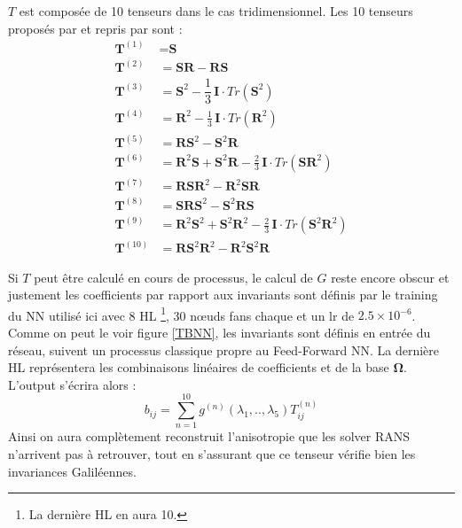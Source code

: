 \documentclass[a4paper,12pt]{report}
\numberwithin{equation}{section} %
\begin{document}
\noindent $T$ est composée de 10 tenseurs dans le cas tridimensionnel. Les 10 tenseurs proposés par \cite{pope1975more} et repris par \cite{ling2016reynolds} sont :
\begin{align*}
\textbf{T}^{(1)} &= \textbf{S} \\
\textbf{T}^{(2)} &= \textbf{S}\textbf{R} - \textbf{R}\textbf{S} \\
\textbf{T}^{(3)} &= \textbf{S}^2 - \dfrac{1}{3}\, \textbf{I} \cdot Tr \left( \textbf{S}^2 \right)\\
\textbf{T}^{(4)} &= \textbf{R}^2 - \frac{1}{3}\, \textbf{I} \cdot Tr \left( \textbf{R}^2 \right)\\
\textbf{T}^{(5)} &= \textbf{R}\textbf{S}^2 - \textbf{S}^2\textbf{R}\\
\textbf{T}^{(6)} &= \textbf{R}^2\textbf{S} + \textbf{S}^2\textbf{R} - \frac{2}{3}\, \textbf{I}\cdot Tr\left(\textbf{S}\textbf{R}^2 \right) \\
\textbf{T}^{(7)} &= \textbf{R}\textbf{S}\textbf{R}^2 - \textbf{R}^2\textbf{S}\textbf{R} \\
\textbf{T}^{(8)} &= \textbf{S}\textbf{R}\textbf{S}^2 - \textbf{S}^2\textbf{R}\textbf{S} \\
\textbf{T}^{(9)} &= \textbf{R}^2\textbf{S}^2 + \textbf{S}^2\textbf{R}^2 - \frac{2}{3}\, \textbf{I}\cdot Tr\left(\textbf{S}^2\textbf{R}^2 \right)\\
\textbf{T}^{(10)} &= \textbf{R}\textbf{S}^2\textbf{R}^2 - \textbf{R}^2\textbf{S}^2\textbf{R}
\end{align*}

\noindent Si $T$ peut être calculé en cours de processus, le calcul de $G$ reste encore obscur et justement les coefficients par rapport aux invariants sont définis par le training du NN utilisé ici avec 8 HL \footnote{La dernière HL en aura 10.}, 30 nœuds fans chaque et un lr de $2.5 \times 10^{-6}$. \\

Comme on peut le voir figure \eqref{TBNN}, les invariants sont définis en entrée du réseau, suivent un processus classique propre au Feed-Forward NN. La dernière HL représentera les combinaisons linéaires de coefficients et de la base $\mathbf{\Omega}$. \\
L'output s'écrira alors : $$ b_{ij} = \sum_{n=1}^{10} g^{(n)}(\lambda_1,..,\lambda_5) T_{ij}^{(n)}$$
Ainsi on aura complètement reconstruit l'anisotropie que les solver RANS n'arrivent pas à retrouver, tout en s'assurant que ce tenseur vérifie bien les invariances Galiléennes.

\pagebreak



\end{document}
